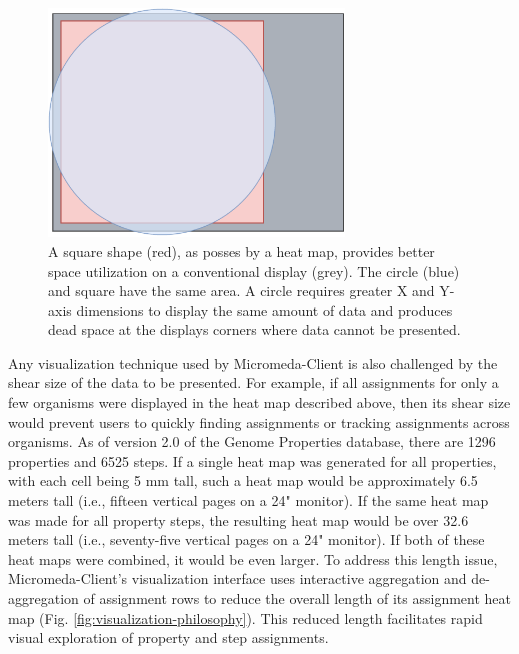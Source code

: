 \begin{figure}[!ht]
  \centering
	\includegraphics[width=0.7\textwidth]{media/square_vs_circle.pdf}
	 \caption{A square shape (red), as posses by a heat map, provides better space utilization on a conventional display (grey). The circle (blue) and square have the same area. A circle requires greater X and Y-axis dimensions to display the same amount of data and produces dead space at the displays corners where data cannot be presented.}
	 \label{fig:circle-square}
\end{figure}

Any visualization technique used by Micromeda-Client is also challenged by the shear size of the data to be presented. For example, if all assignments for only a few organisms were displayed in the heat map described above, then its shear size would prevent users to quickly finding assignments or tracking assignments across organisms. As of version 2.0 of the Genome Properties database, there are 1296 properties and 6525 steps. If a single heat map was generated for all properties, with each cell being 5 mm tall, such a heat map would be approximately 6.5 meters tall (i.e., fifteen vertical pages on a 24" monitor). If the same heat map was made for all property steps, the resulting heat map would be over 32.6 meters tall (i.e., seventy-five vertical pages on a 24" monitor). If both of these heat maps were combined, it would be even larger. To address this length issue, Micromeda-Client's visualization interface uses interactive aggregation and de-aggregation of assignment rows to reduce the overall length of its assignment heat map (Fig. \ref{fig:visualization-philosophy}). This reduced length facilitates rapid visual exploration of property and step assignments.

